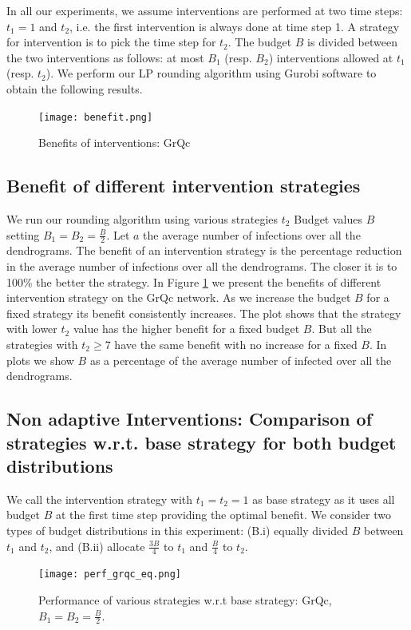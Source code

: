 In all our experiments, we assume interventions are performed at two time steps: $t_1 = 1$ and $t_2$, i.e. the first intervention is always done at time step 1. A strategy for intervention is to pick the time step for $t_2$. The budget $B$ is divided between the two interventions as follows: at most $B_1$ (resp. $B_2$) interventions allowed at $t_1$ (resp. $t_2$). We perform our LP rounding algorithm using Gurobi software to obtain the following results.

\begin{figure}[!h]
    \centering
    \texttt{[image: benefit.png]}
    \caption{Benefits of interventions: GrQc}
    \label{fig:grqc_benefit}
\end{figure}

\subsection{Benefit of different intervention strategies}
We run our rounding algorithm using various strategies $t_2$ Budget values $B$ setting $B_1 = B_2 = \frac{B}{2}$. Let $a$ the average number of infections over all the dendrograms. The benefit of an intervention strategy is the percentage reduction in the average number of infections over all the dendrograms. The closer it is to 100\% the better the strategy. In Figure \ref{fig:grqc_benefit} we present the benefits of different intervention strategy on the GrQc network. As we increase the budget $B$ for a fixed strategy its benefit consistently increases. The plot shows that the strategy with lower $t_2$ value has the higher benefit for a fixed budget $B$. But all the strategies with $t_2 \geq 7$ have the same benefit with no increase for a fixed $B$. In plots we show $B$ as a percentage of the average number of infected over all the dendrograms.

\subsection{Non adaptive Interventions: Comparison of strategies w.r.t. base strategy for both budget distributions}
We call the intervention strategy with $t_1 = t_2 = 1$ as base strategy as it uses all budget $B$ at the first time step providing the optimal benefit. We consider two types of budget distributions in this experiment: (B.i) equally divided $B$ between $t_1$ and $t_2$, and (B.ii) allocate $\frac{3B}{4}$ to $t_1$ and $\frac{B}{4}$ to $t_2$. 
\begin{figure}[!h]
    \centering
    \texttt{[image: perf\_grqc\_eq.png]}
    \caption{Performance of various strategies w.r.t base strategy: GrQc, $B_1 = B_2 = \frac{B}{2}$.}
    \label{fig:grqc_performance_eq}
\end{figure}

